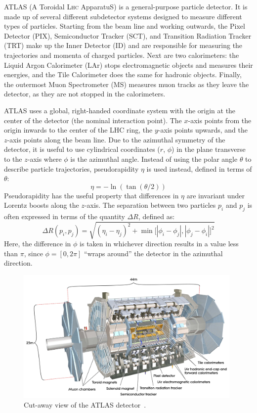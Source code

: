﻿ATLAS (A Toroidal L{\scshape hc} ApparatuS) is a general-purpose particle detector.
It is made up of several different subdetector systems designed to measure different types of particles.
Starting from the beam line and working outwards, the Pixel Detector (PIX), Semiconductor Tracker (SCT), and Transition Radiation Tracker (TRT) make up the Inner Detector (ID) and are responsible for measuring the trajectories and momenta of charged particles.
Next are two calorimeters: the Liquid Argon Calorimeter (LAr) stops electromagnetic objects and measures their energies, and the Tile Calorimeter does the same for hadronic objects.
Finally, the outermost Muon Spectrometer (MS) measures muon tracks as they leave the detector, as they are not stopped in the calorimeters.

ATLAS uses a global, right-handed coordinate system with the origin at the center of the detector (the nominal interaction point).
The $x$-axis points from the origin inwards to the center of the LHC ring, the $y$-axis points upwards, and the $z$-axis points along the beam line.
Due to the azimuthal symmetry of the detector, it is useful to use cylindrical coordinates ($r$, $\phi$) in the plane transverse to the $z$-axis where $\phi$ is the azimuthal angle.
Instead of using the polar angle $\theta$ to describe particle trajectories, pseudorapidity $\eta$ is used instead, defined in terms of $\theta$:
\begin{equation}
  \eta = -\ln(\tan(\theta/2))
  \label{eq:eta}
\end{equation}
Pseudorapidity has the useful property that differences in $\eta$ are invariant under Lorentz boosts along the $z$-axis.
The separation between two particles $p_i$ and $p_j$ is often expressed in terms of the quantity $\Delta R$, defined as:
\begin{equation}
  \Delta R(p_i,p_j) = \sqrt{(\eta_i-\eta_j)^2 + \min\big[|\phi_i-\phi_j|, |\phi_j-\phi_i|\big]^2}
  \label{eq:deltar}
\end{equation}
Here, the difference in $\phi$ is taken in whichever direction results in a value less than $\pi$, since $\phi = [0,2\pi]$ ``wraps around'' the detector in the azimuthal direction.

\begin{figure}[tbp]
  \begin{center}
    \includegraphics[width=0.98\textwidth]{figs/detector/atlas.pdf}
  \end{center}
  \caption[Cut-away view of the ATLAS detector.]{Cut-away view of the ATLAS detector~\cite{PERF-2007-01}.}
\end{figure}
